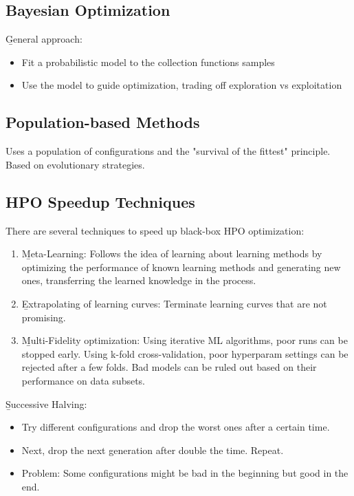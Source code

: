 \subsection{Bayesian Optimization}
\b{General approach:}
\begin{itemize}
    \item Fit a probabilistic model to the collection functions samples
    \item Use the model to guide optimization, trading off exploration vs exploitation
\end{itemize}

\subsection{Population-based Methods}
Uses a population of configurations and the "survival of the fittest" principle. Based on evolutionary strategies.

\subsection{HPO Speedup Techniques}
There are several techniques to speed up black-box HPO optimization:
\begin{enumerate}
    \item \b{Meta-Learning:} Follows the idea of learning about learning methods by optimizing the performance of known learning methods and generating new ones, transferring the learned knowledge in the process.
    \item \b{Extrapolating of learning curves:} Terminate learning curves that are not promising.
    \item \b{Multi-Fidelity optimization:} Using iterative ML algorithms, poor runs can be stopped early. Using k-fold cross-validation, poor hyperparam settings can be rejected after a few folds. Bad models can be ruled out based on their performance on data subsets.
\end{enumerate}

\b{Successive Halving:}
\begin{itemize}
    \item Try different configurations and drop the worst ones after a certain time.
    \item Next, drop the next generation after double the time. Repeat.
    \item Problem: Some configurations might be bad in the beginning but good in the end.
\end{itemize}

